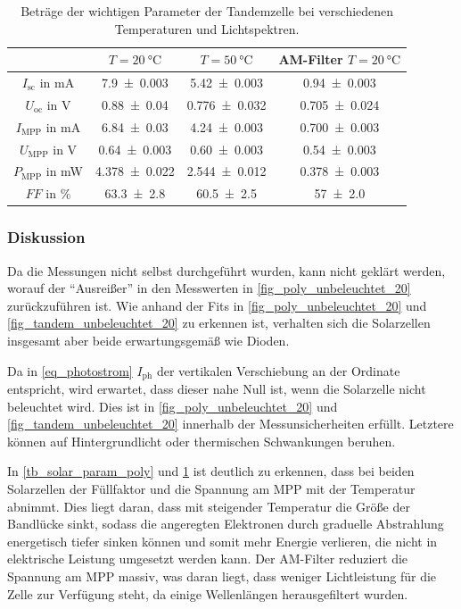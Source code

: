 \documentclass[
	a4paper,
	12pt,
	pagesize,
	ngerman
]{scrartcl}
\begin{document}
\begin{table}[H]
		\centering
		\begin{tabular}{c | c | c | c  }
			 &$T=\SI{20}{\celsius}$& $T=\SI{50}{\celsius}$& AM-Filter $T=\SI{20}{\celsius}$ \\ \hline
			 $I_\text{sc}$ in \si{mA}& \SI{7.9+-0.003}{}&\SI{5.42+-0.003}{}& \SI{0.94+-0.003}{} \\
			 $U_\text{oc}$ in \si{V}&\SI{0.88+-0.04}{}&\SI{0.776+-0.032}{}&\SI{0.705+-0.024}{} \\
			 $I_\text{MPP}$ in \si{mA}&\SI{6.84+-0.03}{}&\SI{4.24+-0.003}{}&\SI{0.700+-0.003}{} \\
			 $U_\text{MPP}$ in \si{V}&\SI{0.64+-0.003}{}&\SI{0.60+-0.003}{}&\SI{0.54+-0.003}{} \\
			 $P_\text{MPP}$ in \si{mW}&\SI{4.378+-0.022}{}&\SI{2.544+-0.012}{}&\SI{0.378+-0.003}{} \\
			 $FF$ in \si{\percent}&\SI{63.3+-2.8}{}&\SI{60.5+-2.5}{}&\SI{57+-2.0}{} \\
		\end{tabular}
		\caption{
		Beträge der wichtigen Parameter der Tandemzelle bei verschiedenen Temperaturen und Lichtspektren.
		}
		\label{tb_solar_param_tandem}
\end{table}
	\subsubsection{Diskussion}
	Da die Messungen nicht selbst durchgeführt wurden, kann nicht geklärt werden, worauf der \enquote{Ausreißer} in den Messwerten in \cref{fig_poly_unbeleuchtet_20} zurückzuführen ist.
	Wie anhand der Fits in \cref{fig_poly_unbeleuchtet_20} und \cref{fig_tandem_unbeleuchtet_20} zu erkennen ist, verhalten sich die Solarzellen insgesamt aber beide erwartungsgemäß wie Dioden.

	Da in \cref{eq_photostrom} $I_\text{ph}$ der vertikalen Verschiebung an der Ordinate entspricht, wird erwartet, dass dieser nahe Null ist, wenn die Solarzelle nicht beleuchtet wird.
	Dies ist in \cref{fig_poly_unbeleuchtet_20} und \cref{fig_tandem_unbeleuchtet_20} innerhalb der Messunsicherheiten erfüllt.
	Letztere können auf Hintergrundlicht oder thermischen Schwankungen beruhen.

	In \cref{tb_solar_param_poly} und \cref{tb_solar_param_tandem} ist deutlich zu erkennen, dass bei beiden Solarzellen der Füllfaktor und die Spannung am MPP mit der Temperatur abnimmt.
	Dies liegt daran, dass mit steigender Temperatur die Größe der Bandlücke sinkt, sodass die angeregten Elektronen durch graduelle Abstrahlung energetisch tiefer sinken können und somit mehr Energie verlieren, die nicht in elektrische Leistung umgesetzt werden kann.
	Der AM-Filter reduziert die Spannung am MPP massiv, was daran liegt, dass weniger Lichtleistung für die Zelle zur Verfügung steht, da einige Wellenlängen herausgefiltert wurden.
\end{document}

